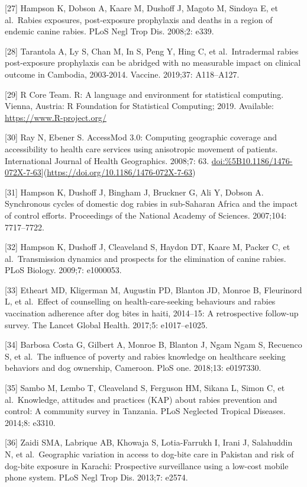 \documentclass[
]{book}
\begin{document}
{[}27{]} Hampson K, Dobson A, Kaare M, Dushoff J, Magoto M, Sindoya E, et
al.~Rabies exposures, post-exposure prophylaxis and deaths in a region
of endemic canine rabies. PLoS Negl Trop Dis. 2008;2: e339.

{[}28{]} Tarantola A, Ly S, Chan M, In S, Peng Y, Hing C, et al.~Intradermal
rabies post-exposure prophylaxis can be abridged with no measurable
impact on clinical outcome in Cambodia, 2003-2014. Vaccine. 2019;37:
A118--A127.

{[}29{]} R Core Team. R: A language and environment for statistical
computing. Vienna, Austria: R Foundation for Statistical Computing;
2019. Available: \url{https://www.R-project.org/}

{[}30{]} Ray N, Ebener S. AccessMod 3.0: Computing geographic coverage and
accessibility to health care services using anisotropic movement of
patients. International Journal of Health Geographics. 2008;7: 63.
\url{doi:\%5B10.1186/1476-072X-7-63}{]}(\url{https://doi.org/10.1186/1476-072X-7-63})

{[}31{]} Hampson K, Dushoff J, Bingham J, Bruckner G, Ali Y, Dobson A.
Synchronous cycles of domestic dog rabies in sub-Saharan Africa and the
impact of control efforts. Proceedings of the National Academy of
Sciences. 2007;104: 7717--7722.

{[}32{]} Hampson K, Dushoff J, Cleaveland S, Haydon DT, Kaare M, Packer C,
et al.~Transmission dynamics and prospects for the elimination of canine
rabies. PLoS Biology. 2009;7: e1000053.

{[}33{]} Etheart MD, Kligerman M, Augustin PD, Blanton JD, Monroe B,
Fleurinord L, et al.~Effect of counselling on health-care-seeking
behaviours and rabies vaccination adherence after dog bites in haiti,
2014--15: A retrospective follow-up survey. The Lancet Global Health.
2017;5: e1017--e1025.

{[}34{]} Barbosa Costa G, Gilbert A, Monroe B, Blanton J, Ngam Ngam S,
Recuenco S, et al.~The influence of poverty and rabies knowledge on
healthcare seeking behaviors and dog ownership, Cameroon. PloS one.
2018;13: e0197330.

{[}35{]} Sambo M, Lembo T, Cleaveland S, Ferguson HM, Sikana L, Simon C, et
al.~Knowledge, attitudes and practices (KAP) about rabies prevention and
control: A community survey in Tanzania. PLoS Neglected Tropical
Diseases. 2014;8: e3310.

{[}36{]} Zaidi SMA, Labrique AB, Khowaja S, Lotia-Farrukh I, Irani J,
Salahuddin N, et al.~Geographic variation in access to dog-bite care in
Pakistan and risk of dog-bite exposure in Karachi: Prospective
surveillance using a low-cost mobile phone system. PLoS Negl Trop Dis.
2013;7: e2574.
\end{document}

